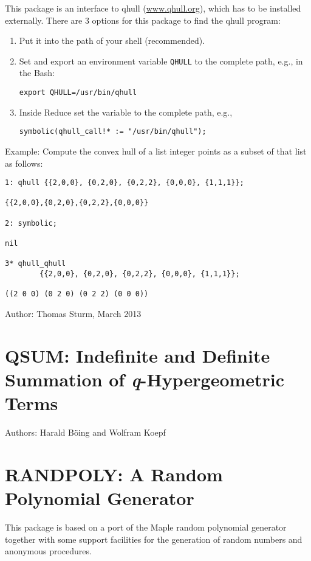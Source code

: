 This package is an interface to qhull (\href{http://www.qhull.org}{www.qhull.org}),
which has to be installed externally.  There are 3 options for this
package to find the qhull program:
\begin{enumerate}
\item Put it into the path of your shell (recommended).
\item Set and export an environment variable \texttt{QHULL} to the complete path, e.g., in
the Bash:
\begin{verbatim}
export QHULL=/usr/bin/qhull
\end{verbatim}
\item Inside Reduce set the variable  to the complete path, e.g.,
\begin{verbatim}
symbolic(qhull_call!* := "/usr/bin/qhull");
\end{verbatim}
\end{enumerate}
Example:
Compute the convex hull of a list integer points as a subset
of that list as follows:
\begin{verbatim}
1: qhull {{2,0,0}, {0,2,0}, {0,2,2}, {0,0,0}, {1,1,1}};

{{2,0,0},{0,2,0},{0,2,2},{0,0,0}}

2: symbolic;

nil

3* qhull_qhull
        {{2,0,0}, {0,2,0}, {0,2,2}, {0,0,0}, {1,1,1}};

((2 0 0) (0 2 0) (0 2 2) (0 0 0))
\end{verbatim}

Author: Thomas Sturm, March 2013

\newpage


\section{QSUM: Indefinite and Definite Summation
of \textsl{q}-Hypergeometric Terms}

Authors: Harald B\"{o}ing and Wolfram Koepf



\newpage

\section{RANDPOLY: A Random Polynomial Generator}

This package is based on a port of the Maple random polynomial
generator together with some support facilities for the generation
of random numbers and anonymous procedures.

